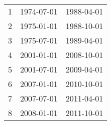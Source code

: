 % 
\begin{tabular}{ccc}
  \hline
  \hline
1 & 1974-07-01 & 1988-04-01 \\ 
  2 & 1975-01-01 & 1988-10-01 \\ 
  3 & 1975-07-01 & 1989-04-01 \\ 
  4 & 2001-01-01 & 2008-10-01 \\ 
  5 & 2001-07-01 & 2009-04-01 \\ 
  6 & 2007-01-01 & 2010-10-01 \\ 
  7 & 2007-07-01 & 2011-04-01 \\ 
  8 & 2008-01-01 & 2011-10-01 \\ 
   \hline
\end{tabular}
